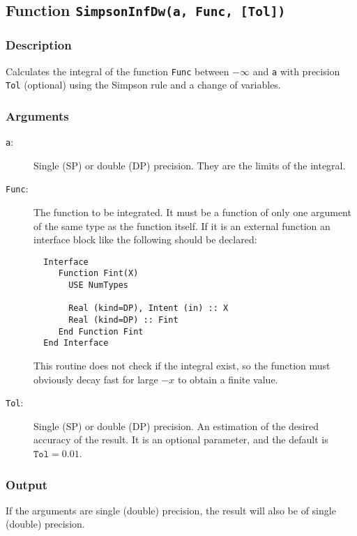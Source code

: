 \subsection{Function \texttt{SimpsonInfDw(a, Func, [Tol])}}

\subsubsection{Description}

Calculates the integral of the function \texttt{Func} between
$- \infty$ and \texttt{a} with precision \texttt{Tol} (optional) using
the Simpson rule and a change of variables.


\subsubsection{Arguments}

\begin{description}
\item[\texttt{a}:] Single (SP) or double (DP) precision. They are
  the limits of the integral.
\item[\texttt{Func}:] The function to be integrated. It must be a
  function of only one argument of the same type as the function
  itself. If it is an
  external function an interface block like the following should be
  declared: 
\begin{verbatim}
  Interface 
     Function Fint(X)
       USE NumTypes

       Real (kind=DP), Intent (in) :: X
       Real (kind=DP) :: Fint
     End Function Fint
  End Interface
\end{verbatim}
  This routine does not check if the integral exist, so the function
  must obviously decay fast for large $-x$ to obtain a finite value.
\item[\texttt{Tol}:] Single (SP) or double (DP) precision. An
  estimation of the desired accuracy of the result. It is an optional
  parameter, and the default is $\mathtt{Tol} = 0.01$. 
\end{description}


\subsubsection{Output}

If the arguments are single (double) precision, the result will also be of
single (double) precision. 


